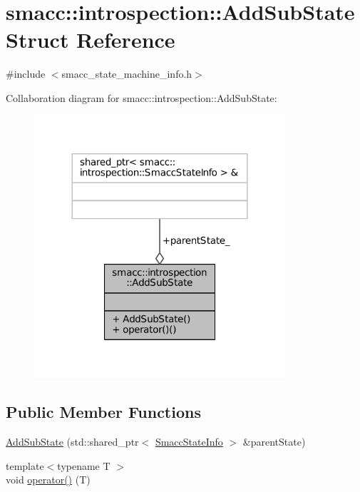 \hypertarget{structsmacc_1_1introspection_1_1AddSubState}{}\section{smacc\+:\+:introspection\+:\+:Add\+Sub\+State Struct Reference}
\label{structsmacc_1_1introspection_1_1AddSubState}


{\ttfamily \#include $<$smacc\+\_\+state\+\_\+machine\+\_\+info.\+h$>$}



Collaboration diagram for smacc\+:\+:introspection\+:\+:Add\+Sub\+State\+:
\nopagebreak
\begin{figure}[H]
\begin{center}
\leavevmode
\includegraphics[width=264pt]{structsmacc_1_1introspection_1_1AddSubState__coll__graph}
\end{center}
\end{figure}
\subsection*{Public Member Functions}
\begin{DoxyCompactItemize}
\item 
\hyperlink{structsmacc_1_1introspection_1_1AddSubState_a9556919fdfce601d7746c8f3efcf298b}{Add\+Sub\+State} (std\+::shared\+\_\+ptr$<$ \hyperlink{classsmacc_1_1introspection_1_1SmaccStateInfo}{Smacc\+State\+Info} $>$ \&parent\+State)
\item 
{\footnotesize template$<$typename T $>$ }\\void \hyperlink{structsmacc_1_1introspection_1_1AddSubState_aa7c4d53de4a64ef0873bde700ed7317f}{operator()} (T)
\end{DoxyCompactItemize}
